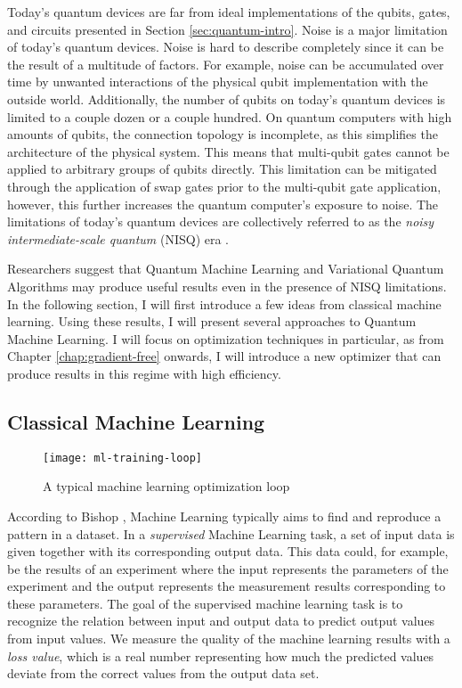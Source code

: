 Today's quantum devices are far from ideal implementations of the qubits, gates,
and circuits presented in Section \ref{sec:quantum-intro}.
Noise is a major limitation of today's quantum devices.
Noise is hard to describe completely since it can be the result of a multitude
of factors.
For example, noise can be accumulated over time by unwanted interactions of the
physical qubit implementation with the outside world.
Additionally, the number of qubits on today's quantum devices is limited to a
couple dozen or a couple hundred.
On quantum computers with high amounts of qubits, the connection topology is
incomplete, as this simplifies the architecture of the physical system. 
This means that multi-qubit gates cannot be applied to arbitrary groups of
qubits directly.
This limitation can be mitigated through the application of swap gates prior
to the multi-qubit gate application, however, this further increases the quantum
computer's exposure to noise.
The limitations of today's quantum devices are collectively referred to as the
\emph{noisy intermediate-scale quantum} (NISQ) era
\cite{preskill_quantum_2018,nielsen_quantum_2007}.

Researchers suggest that Quantum Machine Learning and Variational Quantum
Algorithms may produce useful results even in the presence of NISQ limitations.
In the following section, I will first introduce a few ideas from classical
machine learning.
Using these results, I will present several approaches to Quantum Machine
Learning.
I will focus on optimization techniques in particular, as from Chapter
\ref{chap:gradient-free} onwards, I will introduce a new optimizer that can
produce results in this regime with high efficiency.

\subsection{Classical Machine Learning}
\begin{figure}
    \centering
    \texttt{[image: ml-training-loop]}
    \caption{A typical machine learning optimization loop}
    \label{fig:ml-training-loop}
\end{figure}

According to Bishop \cite{bishop_pattern_2006}, Machine Learning typically aims
to find and reproduce a pattern in a dataset.
In a \emph{supervised} Machine Learning task, a set of input data is given
together with its corresponding output data.
This data could, for example, be the results of an experiment where the input
represents the parameters of the experiment and the output represents the
measurement results corresponding to these parameters.
The goal of the supervised machine learning task is to recognize the relation
between input and output data to predict output values from input values.
We measure the quality of the machine learning results with a
\emph{loss value}, which is a real number representing how much the predicted
values deviate from the correct values from the output data set.

